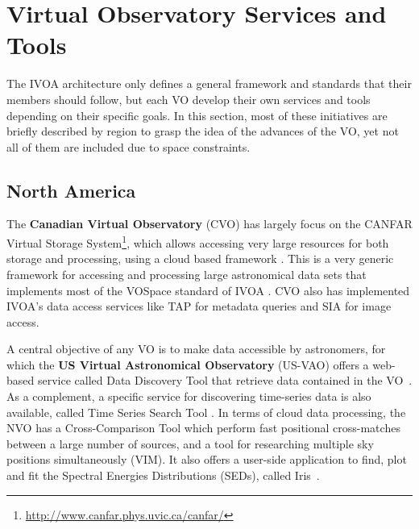 \section{Virtual Observatory Services and Tools}

The IVOA architecture only defines a general framework and
standards that their members should follow, but each VO develop
their own services and tools depending on their specific goals.
In this section, most of these initiatives are briefly
described by region to grasp the idea of the advances of
the VO, yet not all of them are included due to space 
constraints.

\subsection{North America}

The \textbf{Canadian Virtual Observatory} (CVO) has largely focus on the CANFAR Virtual Storage
System\footnote{\url{http://www.canfar.phys.uvic.ca/canfar/}}, which
allows accessing very large resources for both storage and processing, 
using a cloud based framework \cite{}. 
This is a very generic framework for accessing and processing 
large astronomical data sets that implements most of the
VOSpace standard of IVOA \cite{VOSPace}. CVO also has implemented
IVOA's data access services like TAP for metadata queries 
and SIA for
image access.

A central objective of any VO is to make data accessible by astronomers,
for which the \textbf{US Virtual Astronomical Observatory} (US-VAO) 
offers a web-based service called Data Discovery Tool 
that retrieve data contained in the VO~\cite{}. 
As a complement, a specific service for discovering time-series data
is also available, called Time Series Search Tool \cite{}.
In terms of cloud data processing, the NVO has a Cross-Comparison Tool 
which perform fast positional cross-matches between a large number of 
sources, and a tool for researching multiple sky positions simultaneously (VIM).
It also offers a user-side application to find, plot and fit the
Spectral Energies Distributions (SEDs), called Iris~\cite{}.


